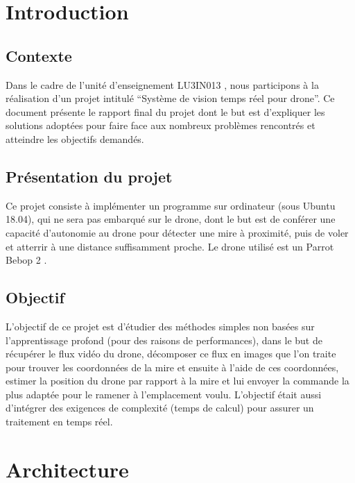 \documentclass[12pt]{article}
\begin{document}
\newpage

\renewcommand{\contentsname}{Sommaire}
\tableofcontents
\newpage

\section{Introduction}

\subsection{Contexte}
 Dans le cadre de l’unité d’enseignement LU3IN013 , nous participons à la réalisation d’un projet intitulé “Système de vision temps réel pour drone”. Ce document présente le rapport final du projet dont le but est d’expliquer les solutions adoptées pour faire face aux nombreux problèmes rencontrés et atteindre les objectifs demandés.

\subsection{Présentation du projet}
 Ce projet consiste à implémenter un programme sur ordinateur (sous Ubuntu 18.04), qui ne sera pas embarqué sur le drone, dont le but est de conférer une capacité d'autonomie au drone pour détecter une mire à proximité, puis de voler et atterrir à une distance suffisamment proche. Le drone utilisé est un Parrot Bebop 2 \cite{bebop}.

\subsection{Objectif}
L’objectif de ce projet est d'étudier des méthodes simples non basées sur l'apprentissage profond (pour des raisons de performances), dans le but de récupérer le flux vidéo du drone, décomposer ce flux en images que l'on traite pour trouver les coordonnées de la mire et ensuite à l'aide de ces coordonnées, estimer la position du drone par rapport à la mire et lui envoyer la commande la plus adaptée pour le ramener à l’emplacement voulu. L’objectif était aussi d’intégrer des exigences de complexité (temps de calcul) pour assurer un traitement en temps réel.

\section{Architecture}
\end{document}
